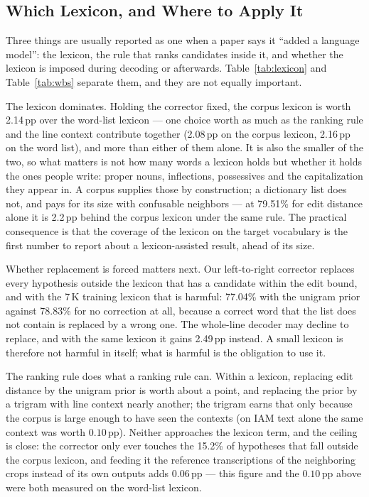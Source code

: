 \documentclass{ws-ijprai}
\begin{document}
\subsection{Which Lexicon, and Where to Apply It}
\label{sec:disc-lex}

Three things are usually reported as one when a paper says it ``added a
language model'': the lexicon, the rule that ranks candidates inside it, and
whether the lexicon is imposed during decoding or afterwards.
Table~\ref{tab:lexicon} and Table~\ref{tab:wbs} separate them, and they
are not equally important.

The lexicon dominates. Holding the corrector fixed, the corpus lexicon is
worth 2.14\,pp over the
word-list lexicon --- one choice worth as much as the ranking rule and the
line context contribute together (2.08\,pp on the corpus lexicon, 2.16\,pp
on the word list), and more than either of them alone. It is also the
smaller of the two, so what
matters is not how many words a lexicon holds but whether it holds the ones
people write: proper nouns, inflections, possessives and the capitalization
they appear in. A corpus supplies those by construction; a dictionary list
does not, and pays for its size with confusable neighbors --- at
79.51\% for edit distance alone it is
2.2\,pp behind the corpus lexicon under the same rule. The practical
consequence is that the coverage of the lexicon on the target vocabulary is
the first number to report about a lexicon-assisted result, ahead of its size.

Whether replacement is forced matters next. Our left-to-right corrector
replaces every hypothesis outside the lexicon that has a candidate within
the edit bound, and with the 7\,K training lexicon that is
harmful: 77.04\% with the unigram prior against
78.83\% for no correction at all, because a correct word that
the list does not contain is replaced by a wrong one. The whole-line decoder
may decline to replace, and with the same lexicon it gains
2.49\,pp instead. A small lexicon is therefore not harmful in itself; what is
harmful is the obligation to use it.

The ranking rule does what a ranking rule can. Within a lexicon, replacing
edit distance by the unigram prior is worth about a point, and replacing the
prior by a trigram with line context nearly another; the trigram earns
that only because the corpus is large enough to have seen the contexts (on
IAM text alone the same context was worth $0.10$\,pp). Neither approaches
the lexicon term, and the ceiling is close: the corrector only ever touches
the 15.2\% of hypotheses that fall outside the corpus lexicon, and feeding it the
reference transcriptions of the neighboring crops instead of its own outputs
adds $0.06$\,pp --- this figure and the $0.10$\,pp above were both
measured on the word-list lexicon.
\end{document}

